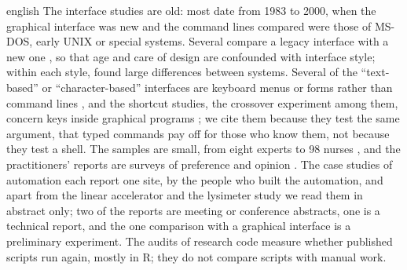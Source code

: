 \begin{onlyin}{english} %
The interface studies are old: most date from 1983 to 2000, when the
graphical interface was new and the command lines compared were those
of MS-DOS, early UNIX or special systems.  Several compare a legacy
interface with a new one \autocite{Staggers2000Comparing}, so that age
and care of design are confounded with interface style; within each
style, \textcite{Whiteside1985User} found large differences between
systems.  Several of the
\enquote{text-based} or \enquote{character-based} interfaces are
keyboard menus or forms rather than command lines
\autocite{Rauterberg1992Empirical,dYdewalle1995Graphical,%
  Chen2007Comparing},
and the shortcut studies, the crossover experiment among them, concern
keys inside graphical programs
\autocite{Remington2016With,Lane2005Hidden,Tak2013Satisficing}; we
cite them because they test the same argument, that typed commands pay
off for those who know them, not because they test a shell.  The
samples are small, from eight experts \autocite{Chen2007Comparing} to
98 nurses \autocite{Staggers2000Comparing}, and the practitioners'
reports are surveys of preference and opinion
\autocite{Takayama2006Trust,Voronkov2019System,Murillo2014Empowering}.
The case studies of automation each report one site, by the people who
built the automation, and apart from the linear accelerator and the
lysimeter study we read them in abstract only; two of the reports are
meeting or conference abstracts, one is a technical report, and the one
comparison with a graphical interface is a preliminary experiment.
The audits of research code measure whether published scripts run
again, mostly in R; they do not compare scripts with manual work.


\end{onlyin}
